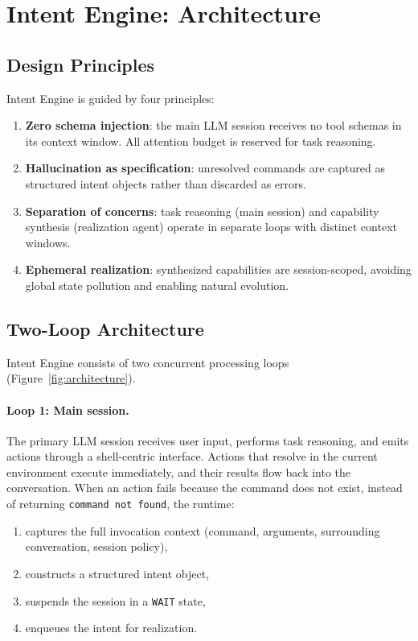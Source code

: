 \documentclass[11pt]{article}
\begin{document}
\section{Intent Engine: Architecture}
\label{sec:architecture}

\subsection{Design Principles}

Intent Engine is guided by four principles:

\begin{enumerate}[leftmargin=*]
  \item \textbf{Zero schema injection}: the main LLM session receives no tool schemas in its context window. All attention budget is reserved for task reasoning.
  \item \textbf{Hallucination as specification}: unresolved commands are captured as structured intent objects rather than discarded as errors.
  \item \textbf{Separation of concerns}: task reasoning (main session) and capability synthesis (realization agent) operate in separate loops with distinct context windows.
  \item \textbf{Ephemeral realization}: synthesized capabilities are session-scoped, avoiding global state pollution and enabling natural evolution.
\end{enumerate}

\subsection{Two-Loop Architecture}
\label{sec:two-loop}

Intent Engine consists of two concurrent processing loops (Figure~\ref{fig:architecture}).

\paragraph{Loop 1: Main session.}
The primary LLM session receives user input, performs task reasoning, and emits actions through a shell-centric interface.
Actions that resolve in the current environment execute immediately, and their results flow back into the conversation.
When an action fails because the command does not exist, instead of returning \texttt{command not found}, the runtime:
\begin{enumerate}[leftmargin=*]
  \item captures the full invocation context (command, arguments, surrounding conversation, session policy),
  \item constructs a structured intent object,
  \item suspends the session in a \texttt{WAIT} state,
  \item enqueues the intent for realization.
\end{enumerate}
\end{document}
